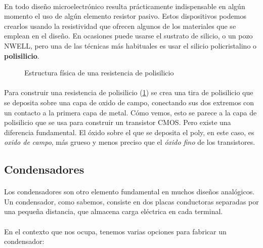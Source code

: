 \paragraph{}
En todo diseño microelectrónico resulta prácticamente indispensable en algún
momento el uso de algún elemento resistor pasivo. Estos dispositivos podemos
crearlos usando la resistividad que ofrecen algunos de los materiales que se emplean
en el diseño. En ocasiones puede usarse el sustrato de silicio, o un pozo NWELL, pero
una de las técnicas más habituales es usar el silicio policristalino o \textbf{polisilicio}.

\begin{figure}[h]
	\centering
	
	\caption{Estructura física de una resistencia de polisilicio}
	\label{fig:poly_res}
\end{figure}

\paragraph{}
Para construir una resistencia de polisilicio (\ref{fig:poly_res}) se crea una tira de polisilicio
que se deposita sobre una capa de oxido de campo, conectando sus dos extremos con
un contacto a la primera capa de metal. Cómo vemos, esto se parece a la capa de
polisilicio que se usa para construir un transistor CMOS. Pero existe una diferencia
fundamental. El óxido sobre el que se deposita el poly, en este caso, es \textit{oxido de
campo}, más grueso y menos preciso que el \textit{óxido fino} de los transistores.

\subsection{Condensadores}\label{cap:condensadores}
\paragraph{}
Los condensadores son otro elemento fundamental en muchos diseños analógicos. Un
condensador, como sabemos, consiste en dos placas conductoras separadas por una pequeña
distancia, que almacena carga eléctrica en cada terminal.

\paragraph{}
En el contexto que nos ocupa, tenemos varias opciones para fabricar un condensador:

